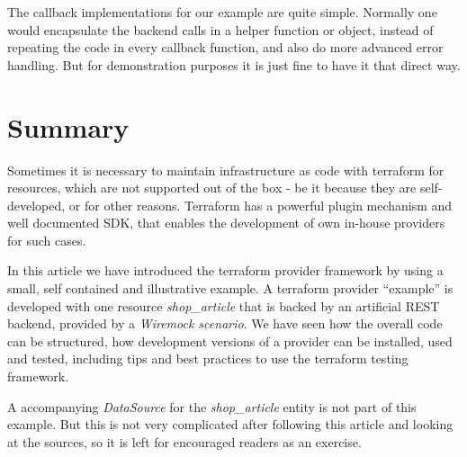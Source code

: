 \documentclass[paper=a4,11pt,numbers=noenddot]{article}
\begin{document}
The callback implementations for our example are quite simple. Normally one would encapsulate the backend calls in a helper function or object, instead of repeating the code in every callback function, and also do more advanced error handling. But for demonstration purposes it is just fine to have it that direct way.

\section{Summary}

Sometimes it is necessary to maintain infrastructure as code with terraform for resources, which are not supported out of the box - be it because they are self-developed, or for other reasons. Terraform has a powerful plugin mechanism and well documented SDK, that enables the development of own in-house providers for such cases.

In this article we have introduced the terraform provider framework by using a small, self contained and illustrative example. A terraform provider ``example'' is developed with one resource \emph{shop\_article} that is backed by an artificial REST backend, provided by a \emph{Wiremock scenario}. We have seen how the overall code can be structured, how development versions of a provider can be installed, used and tested, including tips and best practices to use the terraform testing framework.

A accompanying \emph{DataSource} for the \emph{shop\_article} entity is not part of this example. But this is not very complicated after following this article and looking at the sources, so it is left for encouraged readers as an exercise.

\printbibliography
\end{document}
